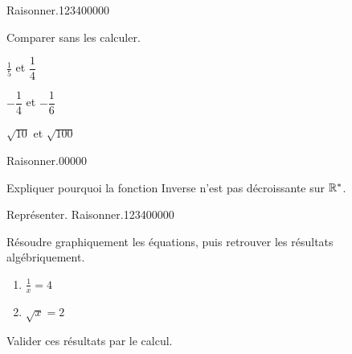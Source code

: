 \begin{pageAD}  %
\restoregeometry %




\begin{ExoCad}{Raisonner.}{1234}{0}{0}{0}{0}{0}

Comparer sans les calculer.
\begin{description}[leftmargin=*]
\item $\frac{1}{5}$ et $\dfrac{1}{4}$  

\item $-\dfrac{1}{4}$ et $-\dfrac{1}{6}$ 

\item $\sqrt{10}$ et $\sqrt{100}$ 

\end{description}

\end{ExoCad} 


\begin{ExoCadN}{Raisonner.}{0}{0}{0}{0}{0}

Expliquer pourquoi la fonction Inverse n'est pas décroissante sur $\mathbb R^*$.

\end{ExoCadN}
 

 

 

\begin{ExoCad}{Représenter. Raisonner.}{1234}{0}{0}{0}{0}{0}

Résoudre graphiquement les équations, puis retrouver les résultats algébriquement.
\begin{enumerate}[leftmargin=*]
\item $\frac{1}{x}=4$ 
\item $\sqrt{x}=2$ 
\end{enumerate}
Valider ces résultats par le calcul. 

\vspace{0.4cm}

\begin{minipage}{0.48\linewidth}
\end{minipage}
\hfill
\begin{minipage}{0.48\linewidth}
\end{minipage}

\end{ExoCad}



\end{pageAD}
